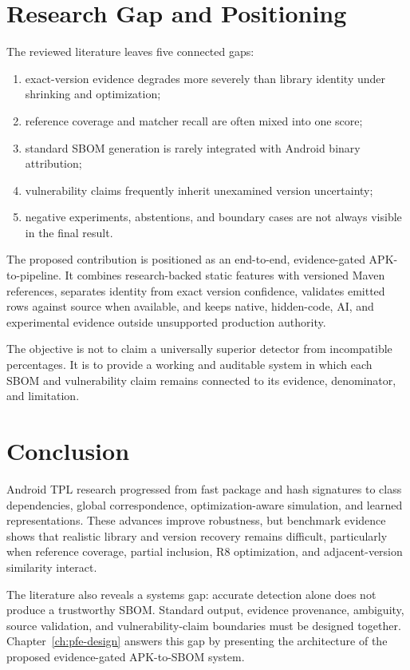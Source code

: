\section{Research Gap and Positioning}

The reviewed literature leaves five connected gaps:

\begin{enumerate}
  \item exact-version evidence degrades more severely than library identity
  under shrinking and optimization;
  \item reference coverage and matcher recall are often mixed into one score;
  \item standard SBOM generation is rarely integrated with Android binary
  attribution;
  \item vulnerability claims frequently inherit unexamined version
  uncertainty;
  \item negative experiments, abstentions, and boundary cases are not always
  visible in the final result.
\end{enumerate}

The proposed contribution is positioned as an end-to-end,
evidence-gated APK-to-\CycloneDX pipeline. It combines research-backed static
features with versioned Maven references, separates identity from exact
version confidence, validates emitted rows against source when available, and
keeps native, hidden-code, AI, and experimental evidence outside unsupported
production authority.

The objective is not to claim a universally superior detector from
incompatible percentages. It is to provide a working and auditable system in
which each SBOM and vulnerability claim remains connected to its evidence,
denominator, and limitation.

\section{Conclusion}

Android TPL research progressed from fast package and hash signatures to class
dependencies, global correspondence, optimization-aware simulation, and
learned representations. These advances improve robustness, but benchmark
evidence shows that realistic library and version recovery remains difficult,
particularly when reference coverage, partial inclusion, R8 optimization, and
adjacent-version similarity interact.

The literature also reveals a systems gap: accurate detection alone does not
produce a trustworthy SBOM. Standard output, evidence provenance, ambiguity,
source validation, and vulnerability-claim boundaries must be designed
together. Chapter~\ref{ch:pfe-design} answers this gap by presenting the
architecture of the proposed evidence-gated APK-to-SBOM system.
